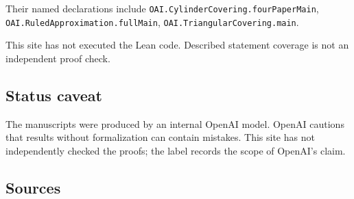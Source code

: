 \documentclass[11pt]{article}
\begin{document}
Their named declarations include \texttt{OAI.CylinderCovering.fourPaperMain}, \texttt{OAI.RuledApproximation.fullMain}, \texttt{OAI.TriangularCovering.main}.

This site has not executed the Lean code. Described statement coverage is not an independent proof check.

\subsection{Status caveat}
The manuscripts were produced by an internal OpenAI model. OpenAI cautions that results without formalization can contain mistakes. This site has not independently checked the proofs; the label records the scope of OpenAI's claim.

\subsection{Sources}
\end{document}
